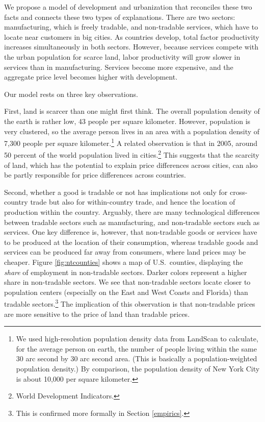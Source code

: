 \documentclass[12pt]{article}
\begin{document}
We propose a model of development and urbanization that reconciles these two facts and connects these two types of explanations. There are two sectors: manufacturing, which is freely tradable, and non-tradable services, which have to locate near customers in big cities. As countries develop, total factor productivity increases simultaneously in both sectors. However, because services compete with the urban population for scarce land, labor productivity will grow slower in services than in manufacturing. Services become more expensive, and the aggregate price level becomes higher with development.

Our model rests on three key observations.

First, land is scarcer than one might first think. The overall population density of the earth is rather low, 43 people per square kilometer.  However, population is very clustered, so the average person lives in an area with a population density of 7,300 people per square kilometer.\footnote{We used high-resolution population density data from LandScan to calculate, for the average person on earth, the number of people living within the same 30 arc second by 30 arc second area. (This is basically a population-weighted population density.) By comparison, the population density of New York City is about 10,000 per square kilometer.} A related observation is that in 2005, around 50 percent of the world population lived in cities.\footnote{World Development Indicators.} This suggests that the scarcity of land, which has the potential to explain price differences across cities, can also be partly responsible for price differences across countries.

Second, whether a good is tradable or not has implications not only for cross-country trade but also for within-country trade, and hence the location of production within the country. Arguably, there are many technological differences between tradable sectors such as manufacturing, and non-tradable sectors such as services. One key difference is, however, that non-tradable goods or services have to be produced at the location of their consumption, whereas tradable goods and services can be produced far away from consumers, where land prices may be cheaper. Figure \ref{fig:ntcounties} shows a map of U.S.~counties, displaying the \emph{share} of employment in non-tradable sectors. Darker colors represent a higher share in non-tradable sectors. We see that non-tradable sectors locate closer to population centers (especially on the East and West Coasts and Florida) than tradable sectors.\footnote{This is confirmed more formally in Section \ref{empirics}.} The implication of this observation is that non-tradable prices are more sensitive to the price of land than tradable prices.
\end{document}

